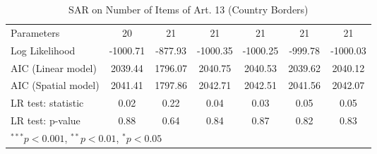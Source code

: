 \begin{table}[!h]
\begin{center}
\begin{tabular}{l c c c c c c }
Parameters              & 20           & 21           & 21           & 21           & 21           & 21           \\
Log Likelihood          & -1000.71     & -877.93      & -1000.35     & -1000.25     & -999.78      & -1000.03     \\
AIC (Linear model)      & 2039.44      & 1796.07      & 2040.75      & 2040.53      & 2039.62      & 2040.12      \\
AIC (Spatial model)     & 2041.41      & 1797.86      & 2042.71      & 2042.51      & 2041.56      & 2042.07      \\
LR test: statistic      & 0.02         & 0.22         & 0.04         & 0.03         & 0.05         & 0.05         \\
LR test: p-value        & 0.88         & 0.64         & 0.84         & 0.87         & 0.82         & 0.83         \\
\bottomrule
\multicolumn{7}{l}{\scriptsize{$^{***}p<0.001$, $^{**}p<0.01$, $^*p<0.05$}}
\end{tabular}
\caption{SAR on Number of Items of Art. 13 (Country Borders)}
\label{table:coefficients}
\end{center}
\end{table}
